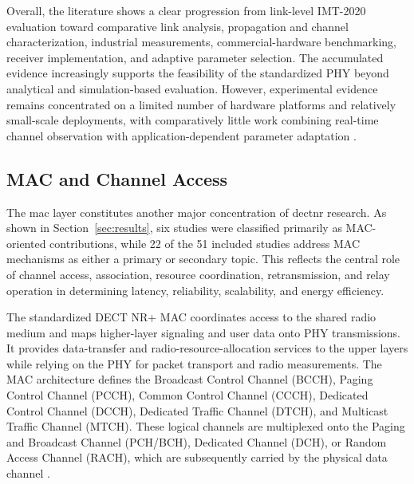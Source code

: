 Overall, the literature shows a clear progression from link-level IMT-2020
evaluation toward comparative link analysis, propagation and channel
characterization, industrial measurements, commercial-hardware benchmarking,
receiver implementation, and adaptive parameter selection. The accumulated
evidence increasingly supports the feasibility of the standardized PHY beyond
analytical and simulation-based evaluation. However, experimental evidence
remains concentrated on a limited number of hardware platforms and relatively
small-scale deployments, with comparatively little work combining real-time
channel observation with application-dependent parameter adaptation
\cite{fagerholmFPGAbasedDECT2020New2024,
bandaraExperimentalValidationAnalysis2025,
grafWhatExpectWhen2026,
grafParetoOptimalityApproach2026a}.
\subsection{MAC and Channel Access}
\label{subsec:mac}

The \gls{mac} layer constitutes another major concentration of \gls{dectnr}
research. As shown in Section~\ref{sec:results}, six studies were classified
primarily as MAC-oriented contributions, while 22 of the 51 included studies
address MAC mechanisms as either a primary or secondary topic. This reflects
the central role of channel access, association, resource coordination,
retransmission, and relay operation in determining latency, reliability,
scalability, and energy efficiency.

The standardized DECT NR+ MAC coordinates access to the shared radio medium
and maps higher-layer signaling and user data onto PHY transmissions. It
provides data-transfer and radio-resource-allocation services to the upper
layers while relying on the PHY for packet transport and radio measurements.
The MAC architecture defines the Broadcast Control Channel (BCCH), Paging
Control Channel (PCCH), Common Control Channel (CCCH), Dedicated Control
Channel (DCCH), Dedicated Traffic Channel (DTCH), and Multicast Traffic
Channel (MTCH). These logical channels are multiplexed onto the Paging and
Broadcast Channel (PCH/BCH), Dedicated Channel (DCH), or Random Access
Channel (RACH), which are subsequently carried by the physical data channel
\cite{etsi_ts103636_4,etsi_ts_103636_4_r2}.

